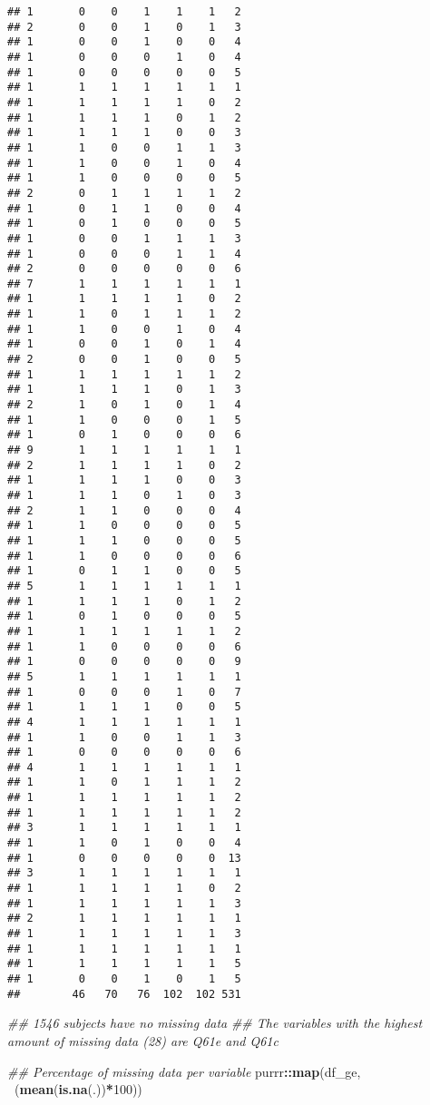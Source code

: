 \documentclass[
]{article}
\newenvironment{Shaded}{\begin{snugshade}}{\end{snugshade}}
\newcommand{\CommentTok}[1]{\textcolor[rgb]{0.56,0.35,0.01}{\textit{#1}}}
\newcommand{\DecValTok}[1]{\textcolor[rgb]{0.00,0.00,0.81}{#1}}
\newcommand{\KeywordTok}[1]{\textcolor[rgb]{0.13,0.29,0.53}{\textbf{#1}}}
\newcommand{\NormalTok}[1]{#1}
\newcommand{\OperatorTok}[1]{\textcolor[rgb]{0.81,0.36,0.00}{\textbf{#1}}}
\begin{document}
\begin{verbatim}
## 1       0    0    1    1    1   2
## 2       0    0    1    0    1   3
## 1       0    0    1    0    0   4
## 1       0    0    0    1    0   4
## 1       0    0    0    0    0   5
## 1       1    1    1    1    1   1
## 1       1    1    1    1    0   2
## 1       1    1    1    0    1   2
## 1       1    1    1    0    0   3
## 1       1    0    0    1    1   3
## 1       1    0    0    1    0   4
## 1       1    0    0    0    0   5
## 2       0    1    1    1    1   2
## 1       0    1    1    0    0   4
## 1       0    1    0    0    0   5
## 1       0    0    1    1    1   3
## 1       0    0    0    1    1   4
## 2       0    0    0    0    0   6
## 7       1    1    1    1    1   1
## 1       1    1    1    1    0   2
## 1       1    0    1    1    1   2
## 1       1    0    0    1    0   4
## 1       0    0    1    0    1   4
## 2       0    0    1    0    0   5
## 1       1    1    1    1    1   2
## 1       1    1    1    0    1   3
## 2       1    0    1    0    1   4
## 1       1    0    0    0    1   5
## 1       0    1    0    0    0   6
## 9       1    1    1    1    1   1
## 2       1    1    1    1    0   2
## 1       1    1    1    0    0   3
## 1       1    1    0    1    0   3
## 2       1    1    0    0    0   4
## 1       1    0    0    0    0   5
## 1       1    1    0    0    0   5
## 1       1    0    0    0    0   6
## 1       0    1    1    0    0   5
## 5       1    1    1    1    1   1
## 1       1    1    1    0    1   2
## 1       0    1    0    0    0   5
## 1       1    1    1    1    1   2
## 1       1    0    0    0    0   6
## 1       0    0    0    0    0   9
## 5       1    1    1    1    1   1
## 1       0    0    0    1    0   7
## 1       1    1    1    0    0   5
## 4       1    1    1    1    1   1
## 1       1    0    0    1    1   3
## 1       0    0    0    0    0   6
## 4       1    1    1    1    1   1
## 1       1    0    1    1    1   2
## 1       1    1    1    1    1   2
## 1       1    1    1    1    1   2
## 3       1    1    1    1    1   1
## 1       1    0    1    0    0   4
## 1       0    0    0    0    0  13
## 3       1    1    1    1    1   1
## 1       1    1    1    1    0   2
## 1       1    1    1    1    1   3
## 2       1    1    1    1    1   1
## 1       1    1    1    1    1   3
## 1       1    1    1    1    1   1
## 1       1    1    1    1    1   5
## 1       0    0    1    0    1   5
##        46   70   76  102  102 531
\end{verbatim}

\begin{Shaded}
\begin{Highlighting}[]
\CommentTok{## 1546 subjects have no missing data}
\CommentTok{## The variables with the highest amount of missing data (28) are Q61e and Q61c}


\CommentTok{## Percentage of missing data per variable}
\NormalTok{purrr}\OperatorTok{::}\KeywordTok{map}\NormalTok{(df_ge, }\OperatorTok{~}\NormalTok{(}\KeywordTok{mean}\NormalTok{(}\KeywordTok{is.na}\NormalTok{(.))}\OperatorTok{*}\DecValTok{100}\NormalTok{))}
\end{Highlighting}
\end{Shaded}
\end{document}
